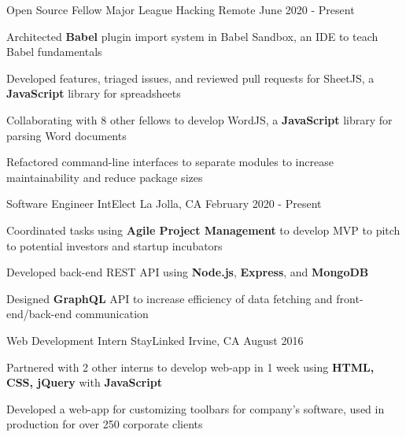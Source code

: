 \documentclass[]{awesome-cv}
\begin{document}
\vspace{-3mm}
\begin{cventries}
  \vspace{-1mm}
	\cventry
	{Open Source Fellow}
	{Major League Hacking}
  {Remote}
	{June 2020 - Present}
	{\begin{cvitems}
    \item {Architected \textbf{Babel} plugin import system in Babel Sandbox, an
      IDE to teach Babel fundamentals}
    \item {Developed features, triaged issues, and reviewed pull requests for
      SheetJS, a \textbf{JavaScript} library for spreadsheets}
    \item {Collaborating with 8 other fellows to develop WordJS, a \textbf{JavaScript} library
    for parsing Word documents}
    \item {Refactored command-line interfaces to separate modules to increase
      maintainability and reduce package sizes}
		\end{cvitems}}

	\vspace{-3mm}
	\cventry
	{Software Engineer}
	{IntElect}
	{La Jolla, CA}
	{February 2020 - Present}
	{\begin{cvitems}
    \item {Coordinated tasks using \textbf{Agile
      Project Management} to develop MVP to pitch to potential investors and
      startup incubators}
    \item {Developed back-end REST API
      using \textbf{Node.js}, \textbf{Express}, and \textbf{MongoDB}}
    \item {Designed \textbf{GraphQL} API to increase efficiency of data fetching
      and front-end/back-end communication}
		\end{cvitems}}

	\vspace{-3mm}
	\cventry
	{Web Development Intern}
	{StayLinked}
	{Irvine, CA}
	{August 2016}
	{\begin{cvitems}
    \item {Partnered with 2 other interns to develop web-app in 1 week using
      \textbf{HTML, CSS, jQuery} with \textbf{JavaScript}}
		\item {Developed a web-app for customizing toolbars for company’s software,
      used in production for over 250 corporate clients}
		\end{cvitems}}
\end{cventries}
\end{document}
